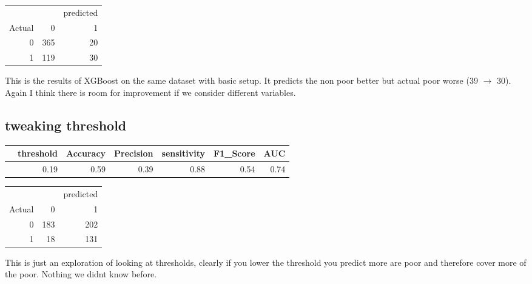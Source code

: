 \documentclass{article}
\begin{document}
\begin{table}[ht]
\centering
\begin{tabular}{rrr}
\hline 
& & predicted
  \\Actual
 & 0 & 1 \\ 
  \hline
0 & 365 &  20 \\ 
  1 & 119 &  30 \\ 
   \hline
\end{tabular}
\end{table}
This is the results of XGBoost on the same dataset with basic setup. It predicts the non poor better but actual poor worse (39 $\rightarrow$ 30). Again I think there is room for improvement if we consider different variables.  
\newpage
\subsection{tweaking threshold}
\begin{table}[ht]
\centering
\begin{tabular}{rrrrrrr}
  \hline
 & threshold & Accuracy & Precision & sensitivity & F1\_Score & AUC \\ 
  \hline
 & 0.19 & 0.59 & 0.39 & 0.88 & 0.54 & 0.74 \\ 
   \hline
\end{tabular}
\end{table}
\begin{table}[ht]
\centering
\begin{tabular}{rrr}
\hline 
& & predicted
  \\Actual
 & 0 & 1 \\ 
  \hline
0 & 183 & 202 \\ 
  1 &  18 & 131 \\ 
   \hline
\end{tabular}
\end{table}

This is just an exploration of looking at thresholds, clearly if you lower the threshold you predict more are poor and therefore cover more of the poor. Nothing we didnt know before. 
\newpage
\end{document}

